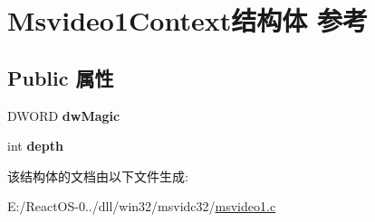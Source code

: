 \hypertarget{struct_msvideo1_context}{}\section{Msvideo1\+Context结构体 参考}
\label{struct_msvideo1_context}
\subsection*{Public 属性}
\begin{DoxyCompactItemize}
\item 
\mbox{\label{struct_msvideo1_context_a5cca4615099c856944ea59bb92b8c8a7}} 
D\+W\+O\+RD {\bfseries dw\+Magic}
\item 
\mbox{\label{struct_msvideo1_context_a42fa6dcbd12acd8b9dcbb6857cc10c1c}} 
int {\bfseries depth}
\end{DoxyCompactItemize}


该结构体的文档由以下文件生成\+:\begin{DoxyCompactItemize}
\item 
E\+:/\+React\+O\+S-\/0../dll/win32/msvidc32/\hyperlink{msvideo1_8c}{msvideo1.\+c}\end{DoxyCompactItemize}

